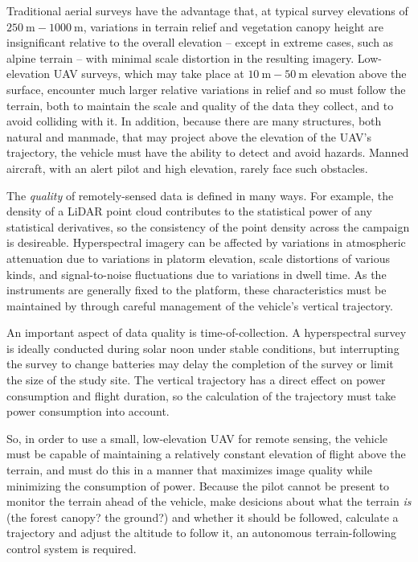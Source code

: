 \documentclass[10pt]{article}
\begin{document}
Traditional aerial surveys have the advantage that, at typical survey elevations of $\SI{250}\m-\SI{1000}\m$, variations in terrain relief and vegetation canopy height are insignificant relative to the overall elevation -- except in extreme cases, such as alpine terrain -- with minimal scale distortion in the resulting imagery. Low-elevation UAV surveys, which may take place at $\SI{10}\m-\SI{50}\m$ elevation above the surface, encounter much larger relative variations in relief and so must follow the terrain, both to maintain the scale and quality of the data they collect, and to avoid colliding with it. In addition, because there are many structures, both natural and manmade, that may project above the elevation of the UAV's trajectory, the vehicle must have the ability to detect and avoid hazards. Manned aircraft, with an alert pilot and high elevation, rarely face such obstacles.

The \emph{quality} of remotely-sensed data is defined in many ways. For example, the density of a LiDAR point cloud contributes to the statistical power of any statistical derivatives, so the consistency of the point density across the campaign is desireable. Hyperspectral imagery can be affected by variations in atmospheric attenuation due to variations in platorm elevation, scale distortions of various kinds, and signal-to-noise fluctuations due to variations in dwell time. As the instruments are generally fixed to the platform, these characteristics must be maintained by through careful management of the vehicle's vertical trajectory.

An important aspect of data quality is time-of-collection. A hyperspectral survey is ideally conducted during solar noon under stable conditions, but interrupting the survey to change batteries may delay the completion of the survey or limit the size of the study site. The vertical trajectory has a direct effect on power consumption and flight duration, so the calculation of the trajectory must take power consumption into account.

So, in order to use a small, low-elevation UAV for remote sensing, the vehicle must be capable of maintaining a relatively constant elevation of flight above the terrain, and must do this in a manner that maximizes image quality while minimizing the consumption of power. Because the pilot cannot be present to monitor the terrain ahead of the vehicle, make desicions about what the terrain \emph{is} (the forest canopy? the ground?) and whether it should be followed, calculate a trajectory and adjust the altitude to follow it, an autonomous terrain-following control system is required.
\end{document}
